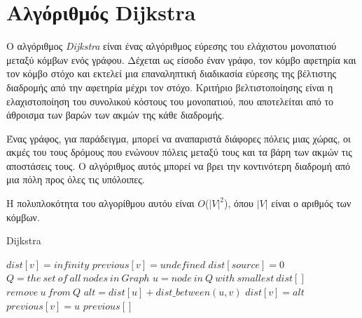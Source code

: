\section{Αλγόριθμός Dijkstra}
\label{section:dijkstra}


Ο αλγόριθμος \emph{Dijkstra} \cite{Dijkstra1959} είναι ένας αλγόριθμος εύρεσης του ελάχιστου μονοπατιού μεταξύ κόμβων ενός γράφου. Δέχεται ως είσοδο έναν γράφο, τον κόμβο αφετηρία και τον κόμβο στόχο και εκτελεί μια επαναληπτική διαδικασία εύρεσης της βέλτιστης διαδρομής από την αφετηρία μέχρι τον στόχο. Κριτήριο βελτιστοποίησης είναι η ελαχιστοποίηση του συνολικού κόστους του μονοπατιού, που αποτελείται από το άθροισμα των βαρών των ακμών της κάθε διαδρομής.

Ένας γράφος, για παράδειγμα, μπορεί να αναπαριστά διάφορες πόλεις μιας χώρας, οι ακμές του τους δρόμους που ενώνουν πόλεις μεταξύ τους και τα βάρη των ακμών τις αποστάσεις τους. Ο αλγόριθμος αυτός μπορεί να βρει την κοντινότερη διαδρομή από μια πόλη προς όλες τις υπόλοιπες.


Η πολυπλοκότητα του αλγορίθμου αυτόυ είναι $O$($|V|^2$), 
όπου $|V|$ είναι ο αριθμός των κόμβων.


\begin{algorithm}[!ht]
\caption{Dijkstra}
\label{alg:dijkstra}
\begin{algorithmic}[1]
            \State $dist[v] = infinity$
            \State $previous[v] = undefined$
        \EndFor
        \State $dist[source] = 0$
        \State $Q = the\ set\ of\ all\ nodes\ in\ Graph$
            \State $u = node\ in\ Q\ with\ smallest\ dist[]$
            \State $remove\ u\ from\ Q$
                \State $alt = dist[u] + dist\_between(u,v)$
                    \State $dist[v] = alt$
                    \State $previous[v] = u$
                \EndIf
            \EndFor
        \EndWhile
        \State \Return $previous[]$
\end{algorithmic}
\end{algorithm}
